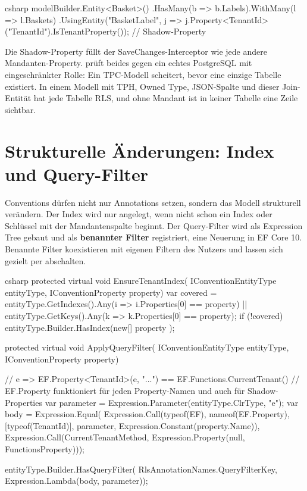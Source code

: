 \begin{sourcecode}[Anwendung]{csharp}
modelBuilder.Entity<Basket>()
    .HasMany(b => b.Labels).WithMany(l => l.Baskets)
    .UsingEntity("BasketLabel",
        j => j.Property<TenantId>("TenantId").IsTenantProperty());   // Shadow-Property
\end{sourcecode}

Die Shadow-Property füllt der SaveChanges-Interceptor wie jede andere Mandanten-Property.
 prüft beides gegen ein echtes
PostgreSQL mit eingeschränkter Rolle: Ein TPC-Modell scheitert, bevor eine einzige Tabelle
existiert. In einem Modell mit TPH, Owned Type, JSON-Spalte und dieser Join-Entität hat jede
Tabelle RLS, und ohne Mandant ist in keiner Tabelle eine Zeile sichtbar.

\section{Strukturelle Änderungen: Index und Query-Filter}

Conventions dürfen nicht nur Annotations setzen, sondern das Modell strukturell verändern.
Der Index wird nur angelegt, wenn nicht schon ein Index oder Schlüssel mit der
Mandantenspalte beginnt. Der Query-Filter wird als Expression Tree gebaut und als
\textbf{benannter Filter} registriert, eine Neuerung in EF Core 10. Benannte Filter
koexistieren mit eigenen Filtern des Nutzers und lassen sich gezielt per
abschalten.

\begin{sourcecode}{csharp}
protected virtual void EnsureTenantIndex(
    IConventionEntityType entityType, IConventionProperty property)
{
    var covered = entityType.GetIndexes().Any(i => i.Properties[0] == property)
                  || entityType.GetKeys().Any(k => k.Properties[0] == property);
    if (!covered)
        entityType.Builder.HasIndex(new[] { property });
}

protected virtual void ApplyQueryFilter(
    IConventionEntityType entityType, IConventionProperty property)
{
    // e => EF.Property<TenantId>(e, "...") == EF.Functions.CurrentTenant()
    // EF.Property funktioniert für jeden Property-Namen und auch für Shadow-Properties
    var parameter = Expression.Parameter(entityType.ClrType, "e");
    var body = Expression.Equal(
        Expression.Call(typeof(EF), nameof(EF.Property), [typeof(TenantId)],
            parameter, Expression.Constant(property.Name)),
        Expression.Call(CurrentTenantMethod, Expression.Property(null, FunctionsProperty)));

    entityType.Builder.HasQueryFilter(
        RlsAnnotationNames.QueryFilterKey, Expression.Lambda(body, parameter));
}
\end{sourcecode}

